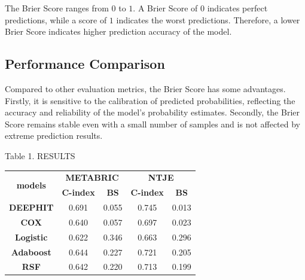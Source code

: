 \documentclass[conference]{IEEEconf}
\begin{document}
The Brier Score ranges from $0$ to $1$. A Brier Score of $0$ indicates perfect predictions, while a score of $1$ indicates the worst predictions. Therefore, a lower Brier Score indicates higher prediction accuracy of the model.

\subsection{Performance Comparison}

Compared to other evaluation metrics, the Brier Score has some advantages. Firstly, it is sensitive to the calibration of predicted probabilities, reflecting the accuracy and reliability of the model's probability estimates. Secondly, the Brier Score remains stable even with a small number of samples and is not affected by extreme prediction results.
\begin{table}[]
	\centering
	\centerline {Table 1. RESULTS}
	\begin{tabular}{|c|cc|cc|}
		\hline
		\multirow{2}{*}{\textbf{models}} & \multicolumn{2}{c|}{\textbf{METABRIC}}              & \multicolumn{2}{c|}{\textbf{NTJE}}                  \\ \cline{2-5} 
		& \multicolumn{1}{c|}{\textbf{C-index}} & \textbf{BS} & \multicolumn{1}{c|}{\textbf{C-index}} & \textbf{BS} \\ \hline
		\textbf{DEEPHIT}                 & \multicolumn{1}{c|}{0.691}            & 0.055       & \multicolumn{1}{c|}{0.745}            & 0.013       \\ \hline
		\textbf{COX}                     & \multicolumn{1}{c|}{0.640}            & 0.057       & \multicolumn{1}{c|}{0.697}            & 0.023       \\ \hline
		\textbf{Logistic}                & \multicolumn{1}{c|}{0.622}            & 0.346       & \multicolumn{1}{c|}{0.663}            & 0.296       \\ \hline
		\textbf{Adaboost}                & \multicolumn{1}{c|}{0.644}            & 0.227       & \multicolumn{1}{c|}{0.721}            & 0.205       \\ \hline
		\textbf{RSF}                      & \multicolumn{1}{c|}{0.642}            & 0.220       & \multicolumn{1}{c|}{0.713}            & 0.199       \\ \hline
	\end{tabular}
\end{table}
\end{document}
